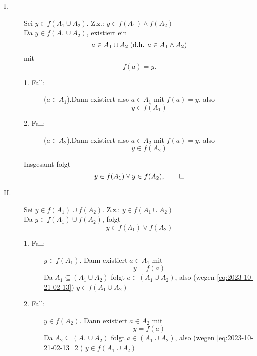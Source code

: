 \documentclass[a4paper, parskip = true, fleqn, headsepline = true]{scrartcl}
\DeclareRobustCommand{\qed}{%
	\ifmmode \tag*{$\Box$}%
	\else \leavevmode\unskip\penalty9999 \hbox{}\nobreak\hfill\quad\hbox{$\Box$}%
	\fi%
}
\begin{document}
\begin{description}
	\item[I.] Sei $ y \in f(A_1 \cup A_2) $. Z.z.: $ y \in f(A_1) \wedge f(A_2) $\\
		Da $ y \in f(A_1 \cup A_2) $, existiert ein 
		\[ a \in A_1 \cup A_2 \text{ (d.h. $ a \in A_1 \wedge A_2 $)} \]
		mit
		\[ f(a) = y. \]
		\begin{description}
			\item[1. Fall:] ($ a \in A_1 $).\quad Dann existiert also $ a \in A_1 $ mit $ f(a) = y $, also
				\[ y \in f(A_1) \]
			\item[2. Fall:] ($ a \in A_2 $).\quad Dann existiert also $ a \in A_2 $ mit $ f(a) = y $, also
				\[ y \in f(A_2) \]
		\end{description}
		Insgesamt folgt
		\[ y \in f(A_1) \vee y \in f(A_2), \qed \]
	\item[II.] Sei $y \in f(A_1) \cup f(A_2) $. Z.z.: $ y \in f(A_1 \cup A_2) $\\
		Da $ y \in f(A_1) \cup f(A_2) $, folgt
			\[ y \in f(A_1) \vee f(A_2) \]
		\begin{description}
			\item[1. Fall:] $ y \in f(A_1) $. Dann existiert $ a \in A_1 $ mit
				\begin{equation}
					\label{eq:2023-10-21-02-13}
					y = f(a)
				\end{equation}
				Da $ A_1 \subseteq ( A_1 \cup A_2 ) $ folgt $ a \in ( A_1 \cup A_2 ) $, also (wegen \ref{eq:2023-10-21-02-13}) $ y \in f(A_1 \cup A_2) $
			\item[2. Fall:] $ y \in f(A_2) $. Dann existiert $ a \in A_2 $ mit
				\begin{equation}
					\label{eq:2023-10-21-02-13_2}
					y = f(a)
				\end{equation}
				Da $ A_2 \subseteq ( A_1 \cup A_2 ) $ folgt $ a \in ( A_1 \cup A_2 ) $, also (wegen \ref{eq:2023-10-21-02-13_2}) $ y \in f(A_1 \cup A_2) $
		\end{description}
\end{description}
\end{document}
